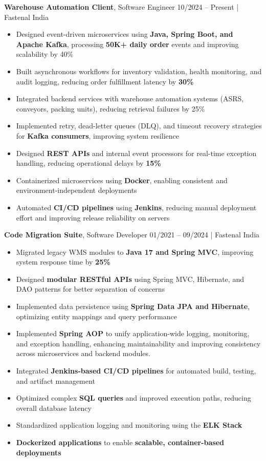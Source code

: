 \documentclass[11.9pt,a4paper]{article}
\begin{document}
\noindent
\textbf{Warehouse Automation Client}, Software Engineer \hfill 10/2024 -- Present | Fastenal India
\begin{itemize}
  \item Designed event-driven microservices using \textbf{Java, Spring Boot, and Apache Kafka}, processing \textbf{50K+ daily order} events and improving scalability by 40\%
  \item Built asynchronous workflows for inventory validation, health monitoring, and audit logging, reducing order fulfillment latency by \textbf{30\%}
  \item Integrated backend services with warehouse automation systems (ASRS, conveyors, packing units), reducing retrieval failures by 25\%
  \item Implemented retry, dead-letter queues (DLQ), and timeout recovery strategies for \textbf{Kafka consumers}, improving system resilience
  \item Designed \textbf{REST APIs} and internal event processors for real-time exception handling, reducing operational delays by \textbf{15\%}
  \item Containerized microservices using \textbf{Docker}, enabling consistent and environment-independent deployments
  \item Automated \textbf{CI/CD pipelines} using \textbf{Jenkins}, reducing manual deployment effort and improving release reliability on servers
\end{itemize}

\vspace{15pt}

\noindent
\textbf{Code Migration Suite}, Software Developer \hfill 01/2021 -- 09/2024 | Fastenal India
\begin{itemize}
  \item Migrated legacy WMS modules to \textbf{Java 17 and Spring MVC}, improving system response time by \textbf{25\%}
  \item Designed \textbf{modular RESTful APIs} using Spring MVC, Hibernate, and DAO patterns for better separation of concerns
  \item Implemented data persistence using \textbf{Spring Data JPA and Hibernate}, optimizing entity mappings and query performance
  \item Implemented \textbf{Spring AOP} to unify application-wide logging, monitoring, and exception handling, enhancing maintainability and improving consistency across microservices and backend modules.
  \item Integrated \textbf{Jenkins-based CI/CD pipelines} for automated build, testing, and artifact management
  \item Optimized complex \textbf{SQL queries} and improved execution paths, 
      reducing overall database latency
  \item Standardized application logging and monitoring using the \textbf{ELK Stack}
  \item \textbf{Dockerized applications} to enable \textbf{scalable, container-based deployments}
\end{itemize}
\end{document}
